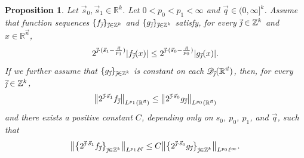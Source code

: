 \documentclass[11pt, reqno]{amsart}
\newtheorem{proposition}[theorem]{Proposition}
\theoremstyle{definition}
\theoremstyle{remark}
\numberwithin{equation}{section}
\newcommand{\R}{\mathbb R}
\newcommand{\vj}{\vec{\textit{\j}}}
\newcommand{\vn}{\vec n}
\newcommand{\vq}{\vec q}
\begin{document}
\begin{proposition} \label{thm-sobolev-prop}
Let $\vec s_0,\vec s_1\in\R^k$.
Let $0<p_0<p_1<\infty$ and $\vq\in(0,\infty]^k$.
Assume that function sequences $\{f_{\vj}\}_{\vj\in\mathbb Z^k}$
and $\{g_{\vj}\}_{\vj\in\mathbb Z^k}$ satisfy,
for every $\vj \in\mathbb Z^k$ and $x\in\mathbb R^{\vec n}$,
\begin{equation}\label{eq:f<g}
2^{\vj\cdot (\vec s_1-\frac{\vec n}{p_1})} |f_{\vj}(x)|
\leq 2^{\vj\cdot (\vec s_0-\frac{\vec n}{p_0})} |g_{\vj}(x)|.
\end{equation}
If we further assume that $\{g_{\vj}\}_{\vj\in\mathbb Z^k}$
is constant on each $\mathscr D_{\vj}(\mathbb R^{\vec n})$,
then, for every $\vj \in\mathbb Z^k$,
\begin{equation}\label{lqLp}
\big\|2^{\vj\cdot \vec s_1}f_{\vj}\big\|_{L^{p_1}(\R^{\vn})}
\leq \big\|2^{\vj\cdot \vec s_0} g_{\vj}\big\|_{L^{p_0}(\R^{\vn})}
\end{equation}
and there exists a positive constant $C$,
depending only on $s_0$, $p_0$, $p_1$, and $\vq$, such that
\begin{equation}\label{Lplq}
\big\|\big\{2^{\vj\cdot \vec s_1} f_{\vj}\big\}_{\vj \in\mathbb Z^k}\big\|_{L^{p_1}\ell^{\vq}}
\leq C \big\|\big\{2^{\vj\cdot \vec s_0} g_{\vj}\big\}_{\vj \in\mathbb Z^k}\big\|_{L^{p_0}\ell^\infty}.
\end{equation}
\end{proposition}
\end{document}
